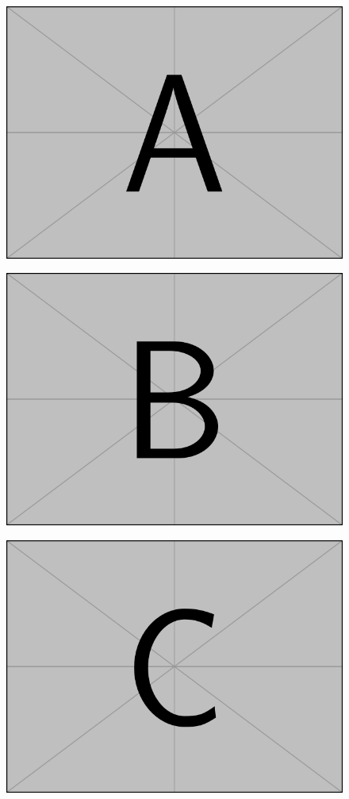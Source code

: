 \documentclass{article}
\begin{document}
\begin{figure}[t]
   \centering 
   \begin{minipage}[b]{.3\hsize}
      \centering
      \includegraphics[width=.8\hsize]{figure/example-image-a.pdf} %
      \label{Fig:Example:A}
   \end{minipage}
   \begin{minipage}[b]{.3\hsize}
      \centering
      \includegraphics[width=.8\hsize]{figure/example-image-b.pdf} %
      \label{Fig:Example:B}
   \end{minipage}
   \begin{minipage}[b]{.3\hsize}
      \centering
      \includegraphics[width=.8\hsize]{figure/example-image-c.pdf} %

\end{minipage}
\end{figure}
\end{document}
